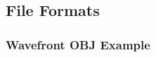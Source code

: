 \subsection{File Formats}

\subsubsection{Wavefront OBJ Example} \label{sec:obj_listing}

\begin{listing}[ht]
    \inputminted[breaklines=true, breakanywhere=true, breaksymbol=\hspace{0pt}, fontsize=\footnotesize]{text}{/Users/liamrobinson/Documents/PyLightCurves/pyspaceaware/resources/models/cube.obj}
\end{listing}